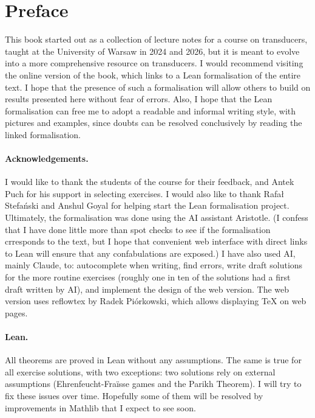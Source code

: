 

\section*{Preface} 

This book started out as a collection of lecture notes for a course on transducers, taught at the University of Warsaw in 2024 and 2026, but it is meant to evolve into a more comprehensive resource on transducers.  I would recommend visiting the online version of the book, which links to a Lean formalisation of the entire text.  I hope that the presence of such a formalisation will allow others to build on results presented here without fear of errors. Also, I hope that the Lean formalisation can free me to adopt a readable and informal writing style, with pictures and examples, since doubts can be resolved conclusively by reading the linked formalisation.

\paragraph*{Acknowledgements.} I would like to thank the students of the course for their feedback, and Antek Puch for his support in selecting exercises. I would also like to thank Rafał Stefański and Anshul Goyal for helping start the Lean formalisation project. Ultimately, the formalisation was done using the AI assistant Aristotle. (I confess that I have done  little more than spot checks to see if the formalisation crresponds to the text, but I hope that convenient web interface with direct links to Lean will ensure that any confabulations are exposed.)  I have also used AI, mainly Claude, to: autocomplete when writing,  find errors, write draft solutions for the more routine exercises (roughly one in ten of the solutions had a first draft written by AI), and implement the design of the web version. The web version uses reflowtex by Radek Piórkowski, which allows displaying TeX on web pages.



\paragraph*{Lean.} 
All theorems are proved in Lean without any assumptions. The same is true for all exercise solutions, with two exceptions: two solutions rely on external assumptions (Ehrenfeucht-Fra\"isse games and the Parikh Theorem).  I will try to fix these issues over time. Hopefully some of them will be resolved by improvements in Mathlib that I expect to see soon.

